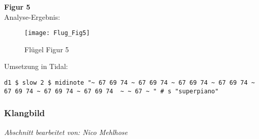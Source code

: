\documentclass[
10pt, %
a4paper, %
oneside, %
headinclude,footinclude, %
BCOR5mm, %
]{scrartcl}
\begin{document}
\noindent \textbf{Figur 5}\\
Analyse-Ergebnis:
\begin{figure}[h]
	\centering 
	\texttt{[image: Flug\_Fig5]} 
	\caption{Flügel Figur 5}
\end{figure}

\noindent Umsetzung in Tidal:
\begin{lstlisting}
d1 $ slow 2 $ midinote "~ 67 69 74 ~ 67 69 74 ~ 67 69 74 ~ 67 69 74 ~ 67 69 74 ~ 67 69 74 ~ 67 69 74  ~ ~ 67 ~ " # s "superpiano"
\end{lstlisting}


\subsubsection{Klangbild}
\textit{Abschnitt bearbeitet von: Nico Mehlhose}\\
\end{document}
